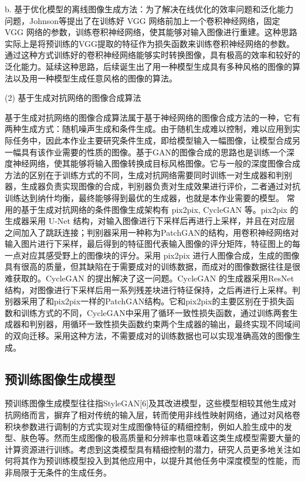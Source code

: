 b. 基于优化模型的离线图像生成方法：为了解决在线优化的效率问题和泛化能力问题，Johnson等提出了在训练好 VGG 网络前加上一个卷积神经网络，固定 VGG 网络的参数，训练卷积神经网络，使其能够对输入图像进行重建。这种思路实际上是将预训练的VGG提取的特征作为损失函数来训练卷积神经网络的参数。通过这种方式训练好的卷积神经网络能够实时转换图像，具有极高的效率和较好的泛化能力。延续这种思路，后续诞生出了用一种模型生成具有多种风格的图像的算法以及用一种模型生成任意风格的图像的算法。

(2) 基于生成对抗网络的图像合成算法

基于生成对抗网络的图像合成算法属于基于神经网络的图像合成方法的一种，它有两种生成方式：随机噪声生成和条件生成。由于随机生成难以控制，难以应用到实际任务中，因此本作业主要研究条件生成，即给模型输入一幅图像，让模型合成另一幅具有该作业需要的性质的图像。基于GAN的图像合成的思路也是训练一个深度神经网络，使其能够将输入图像转换成目标风格图像。它与一般的深度图像合成方法的区别在于训练方式的不同，生成对抗网络需要同时训练一对生成器和判别器，生成器负责实现图像的合成，判别器负责对生成效果进行评价，二者通过对抗训练达到纳什均衡，最终能够得到最优的生成器，也就是本作业需要的模型。
常用的基于生成对抗网络的条件图像生成架构有 pix2pix, CycleGAN 等。pix2pix 的生成器采用 U-Net 结构，对输入图像进行下采样后再进行上采样，并且在对应层之间加入了跳跃连接；判别器采用一种称为PatchGAN的结构，用卷积神经网络对输入图片进行下采样，最后得到的特征图代表输入图像的评分矩阵，特征图上的每一点对应其感受野上的图像块的评分。采用 pix2pix 进行人图像合成，生成的图像具有很高的质量，但其缺陷在于需要成对的训练数据，而成对的图像数据往往是很难获取的。CycleGAN 的提出解决了这一问题。CycleGAN 的生成器采用ResNet结构，对图像进行下采样后用一系列残差块进行特征保持，之后再进行上采样。判别器采用了和pix2pix一样的PatchGAN结构。它和pix2pix的主要区别在于损失函数和训练方式的不同，CycleGAN中采用了循环一致性损失函数，通过训练两套生成器和判别器，用循环一致性损失函数约束两个生成器的输出，最终实现不同域间的双向迁移。采用这种方法，不需要成对的训练数据也可以实现准确高效的图像生成。

\subsection{预训练图像生成模型}

预训练图像生成模型往往指StyleGAN[6]及其改进模型，这些模型相较其他生成对抗网络而言，摒弃了相对传统的输入层，转而使用非线性映射网络，通过对风格卷积块参数进行调制的方式实现对生成图像特征的精细控制，例如人脸生成中的发型、肤色等。然而生成图像的极高质量和分辨率也意味着这类生成模型需要大量的计算资源进行训练。考虑到这类模型具有精细控制的潜力，研究人员更多地关注如何将其作为预训练模型投入到其他应用中，以提升其他任务中深度模型的性能，而非局限于无条件的生成任务。

